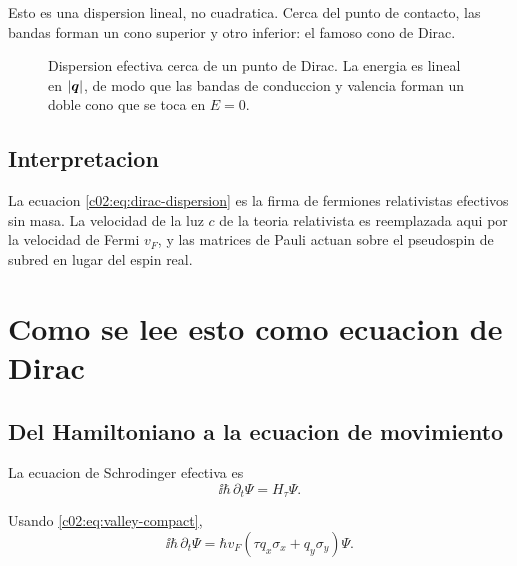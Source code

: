 Esto es una dispersion lineal, no cuadratica. Cerca del punto de contacto, las bandas forman un cono superior y otro inferior: el famoso cono de Dirac.

\begin{figure}[ht]
\centering
{}
\caption{Dispersion efectiva cerca de un punto de Dirac. La energia es lineal en \(|\bm{q}|\), de modo que las bandas de conduccion y valencia forman un doble cono que se toca en \(E=0\).}
\label{c02:fig:cone}
\end{figure}

\subsection{Interpretacion}

La ecuacion \eqref{c02:eq:dirac-dispersion} es la firma de fermiones relativistas efectivos sin masa. La velocidad de la luz \(c\) de la teoria relativista es reemplazada aqui por la velocidad de Fermi \(v_F\), y las matrices de Pauli actuan sobre el pseudospin de subred en lugar del espin real.

\section{Como se lee esto como ecuacion de Dirac}

\subsection{Del Hamiltoniano a la ecuacion de movimiento}

La ecuacion de Schrodinger efectiva es
\begin{equation}
\ii \hbar \,\partial_t \Psi = H_\tau \Psi.
\end{equation}

Usando \eqref{c02:eq:valley-compact},
\begin{equation}
\ii \hbar \,\partial_t \Psi
=
\hbar v_F(\tau q_x \sigma_x + q_y \sigma_y)\Psi.
\end{equation}

